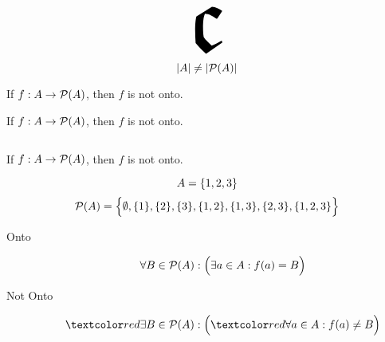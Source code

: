 
\begin{frame}{}
  \begin{center}
  \end{center}

  \[
    \scalebox{8.5}{$\mathfrak{c}$}
  \]
\end{frame}

\begin{frame}{}
  \begin{theorem}
    \[
      |A| \neq |\mathcal{P}(A)|
    \]
  \end{theorem}

  \pause
  \begin{theorem}
    If $f: A \to \mathcal{P}(A)$, then $f$ is not onto.
  \end{theorem}

  \pause
  \vspace{0.60cm}
\end{frame}

\begin{frame}{}
  \begin{theorem}
    If $f: A \to \mathcal{P}(A)$, then $f$ is not onto.
  \end{theorem}

  \vspace{0.60cm}
  \begin{columns}
    \pause
    \pause
    \pause
  \end{columns}
\end{frame}

\begin{frame}{}
  \begin{theorem}
    If $f: A \to \mathcal{P}(A)$, then $f$ is not onto.
  \end{theorem}

  \vspace{0.30cm}
  \[
    A = \{1,2,3\}
  \]
  \pause
  \[
    \mathcal{P}(A) = \Big\{\emptyset, \{1\}, \{2\}, \{3\}, \{1,2\}, \{1,3\}, \{2,3\}, \{1,2,3\}\Big\}
  \]

  \pause
  \begin{description}
    \item[Onto]
      \[
	\forall B \in \mathcal{P}(A): \Big(\exists a \in A: f(a) = B\Big)
      \]
    \pause
    \item[Not Onto]
      \[
	\red{\exists} B \in \ps{A}: \Big(\red{\forall} a \in A: f(a) \neq B\Big)
      \]
  \end{description}
\end{frame}

